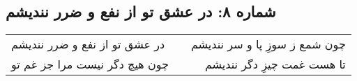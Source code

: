 \begin{center}
\section*{شماره ۸: در عشق تو از نفع و ضرر نندیشم}
\label{sec:008}
\begin{longtable}{l p{0.5cm} r}
در عشق تو از نفع و ضرر نندیشم
&&
چون شمع ز سوزِ پا و سر نندیشم
\\
چون هیچ دگر نیست مرا جز غم تو
&&
تا هست غمت چیزِ دگر نندیشم
\\
\end{longtable}
\end{center}
